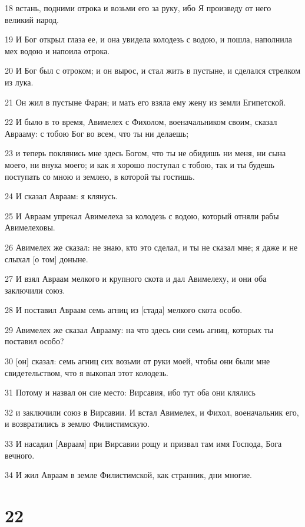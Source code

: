 \par 18 встань, подними отрока и возьми его за руку, ибо Я произведу от него великий народ.
\par 19 И Бог открыл глаза ее, и она увидела колодезь с водою, и пошла, наполнила мех водою и напоила отрока.
\par 20 И Бог был с отроком; и он вырос, и стал жить в пустыне, и сделался стрелком из лука.
\par 21 Он жил в пустыне Фаран; и мать его взяла ему жену из земли Египетской.
\par 22 И было в то время, Авимелех с Фихолом, военачальником своим, сказал Аврааму: с тобою Бог во всем, что ты ни делаешь;
\par 23 и теперь поклянись мне здесь Богом, что ты не обидишь ни меня, ни сына моего, ни внука моего; и как я хорошо поступал с тобою, так и ты будешь поступать со мною и землею, в которой ты гостишь.
\par 24 И сказал Авраам: я клянусь.
\par 25 И Авраам упрекал Авимелеха за колодезь с водою, который отняли рабы Авимелеховы.
\par 26 Авимелех же сказал: не знаю, кто это сделал, и ты не сказал мне; я даже и не слыхал [о том] доныне.
\par 27 И взял Авраам мелкого и крупного скота и дал Авимелеху, и они оба заключили союз.
\par 28 И поставил Авраам семь агниц из [стада] мелкого скота особо.
\par 29 Авимелех же сказал Аврааму: на что здесь сии семь агниц, которых ты поставил особо?
\par 30 [он] сказал: семь агниц сих возьми от руки моей, чтобы они были мне свидетельством, что я выкопал этот колодезь.
\par 31 Потому и назвал он сие место: Вирсавия, ибо тут оба они клялись
\par 32 и заключили союз в Вирсавии. И встал Авимелех, и Фихол, военачальник его, и возвратились в землю Филистимскую.
\par 33 И насадил [Авраам] при Вирсавии рощу и призвал там имя Господа, Бога вечного.
\par 34 И жил Авраам в земле Филистимской, как странник, дни многие.

\chapter{22}

